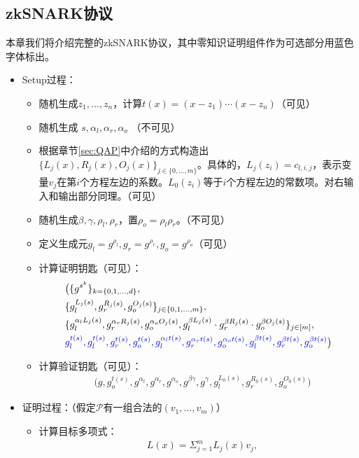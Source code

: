 \documentclass[12pt]{article}
\newcommand{\zk}{zkSNARK}
\newcommand{\pp}{$\mathcal{P}$}
\begin{document}
\subsection{\zk  协议}
本章我们将介绍完整的\zk 协议，其中零知识证明组件作为可选部分用蓝色字体标出。
\begin{itemize}
	\item Setup过程：
	\begin{itemize}
		\item 随机生成$z_1,...,z_n$，计算$t(x)=(x-z_1)\cdots(x-z_n)$（可见）
		\item 随机生成 $s,\alpha_l,\alpha_r,\alpha_o$ （不可见）
		\item 根据章节\ref{sec:QAP}中介绍的方式构造出$\{L_j(x),R_j(x),O_j(x)\}_{j \in \{0,...,m\}}$。具体的，$L_j(z_i)=c_{l,i,j}$，表示变量$v_j$在第$i$个方程左边的系数。$L_0(z_i)$等于$i$个方程左边的常数项。对右输入和输出部分同理。（可见）
		\item 随机生成$\beta,\gamma,\rho_l,\rho_r$，置$\rho_o=\rho_l\rho_r$。（不可见）
		\item 定义生成元$g_l = g^{\rho_l},g_r = g^{\rho_r},g_o= g^{\rho_o}$（可见）
		\item 计算证明钥匙（可见）：
		\begin{align*}
		&\big( \{g^{s^k}\}_{k=\{0,1,...,d\}}, \\
		& \{g_l^{L_j(s)},g_r^{R_j(s)},g_o^{O_j(s)}\}_{j \in \{0,1,...,m\}},\\
		& \{g_l^{\alpha_l L_j(s)}, g_r^{\alpha_r R_j(s)},g_o^{\alpha_o O_j(s)},g_l^{\beta L_j(s)}\cdot g_r^{\beta R_j(s)}\cdot g_o^{\beta O_j(s)} \}_{j \in [m]},\\
		  & {\color{blue} g_l^{t(s)},g_l^{t(s)},g_r^{t(s)},g_o^{t(s)}, g_l^{\alpha_l t(s)}, g_r^{\alpha_r t(s)},g_o^{\alpha_o t(s)}, g_l^{\beta t(s)}, g_r^{\beta t(s)}, g_o^{\beta t(s)}}\big)
		\end{align*}
		\item 计算验证钥匙（可见）：
		\begin{align*}
		&\big(g,g_o^{t(s)},g^{\alpha_l},g^{\alpha_r},g^{\alpha_o},g^{\beta\gamma},g^{\gamma},g_l^{L_0(s)},  g_r^{R_0(s)},  g_o^{O_0(s)}\big)
		\end{align*}
	\end{itemize}
	\item 证明过程：（假定\pp 有一组合法的$(v_1,...,v_m)$）
	\begin{itemize}
		\item 计算目标多项式：
		\begin{align*}
		&L(x)= \Sigma_{j=1}^m L_j(x)v_j,\\

\end{align*}
\end{itemize}
\end{itemize}
\end{document}
